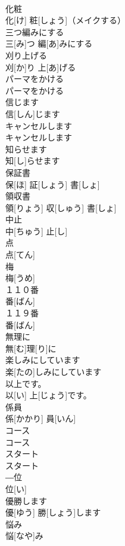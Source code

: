 \documentclass[8pt]{extreport}
\begin{document}
\begin{CJK}{UTF8}{min}
\\	化粧	
\\	化[け] 粧[しょう]（メイクする）		
\\	三つ編みにする	
\\	三[み]つ 編[あ]みにする		
\\	刈り上げる	
\\	刈[か]り 上[あ]げる		
\\	パーマをかける	
\\	パーマをかける		
\\	信じます	
\\	信[しん]じます		
\\	キャンセルします	
\\	キャンセルします		
\\	知らせます	
\\	知[し]らせます		
\\	保証書	
\\	保[ほ] 証[しょう] 書[しょ]		
\\	領収書	
\\	領[りょう] 収[しゅう] 書[しょ]		
\\	中止	
\\	中[ちゅう] 止[し]		
\\	点	
\\	点[てん]		
\\	梅	
\\	梅[うめ]		
\\	１１０番	
\\	番[ばん]		
\\	１１９番	
\\	番[ばん]		
\\	無理に	
\\	無[む]理[り]に		
\\	楽しみにしています	
\\	楽[たの]しみにしています		
\\	以上です。	
\\	以[い] 上[じょう]です。		
\\	係員	
\\	係[かかり] 員[いん]		
\\	コース	
\\	コース		
\\	スタート	
\\	スタート		
\\	―位	
\\	位[い]		
\\	優勝します	
\\	優[ゆう] 勝[しょう]します		
\\	悩み	
\\	悩[なや]み		

\end{CJK}
\end{document}
